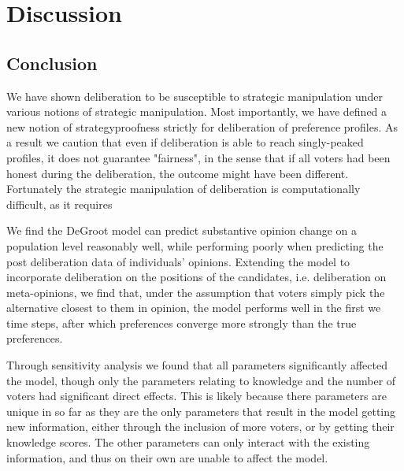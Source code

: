 \newpage
\chapter{Discussion}
\label{Discussion}


\section{Conclusion}

We have shown deliberation to be susceptible to strategic manipulation under
various notions of strategic manipulation. Most importantly, we have defined a
new notion of strategyproofness strictly for deliberation of preference
profiles. As a result we caution that even if deliberation is able to reach
singly-peaked profiles, it does not guarantee "fairness", in the sense that if
all voters had been honest during the deliberation, the outcome might have been
different. Fortunately the strategic manipulation of deliberation is computationally difficult,
as it requires

We find the DeGroot model can predict substantive opinion change on a
population level reasonably well, while performing poorly when predicting the
post deliberation data of individuals' opinions. Extending the model to
incorporate deliberation on the positions of the candidates, i.e. deliberation
on meta-opinions, we find that, under the assumption that voters simply pick
the alternative closest to them in opinion, the model performs well in the
first we time steps, after which preferences converge more strongly than the
true preferences.

Through sensitivity analysis we found that all parameters significantly
affected the model, though only the parameters relating to knowledge and the
number of voters had significant direct effects. This is likely because there
parameters are unique in so far as they are the only parameters that result in
the model getting new information, either through the inclusion of more voters,
or by getting their knowledge scores. The other parameters can only interact
with the existing information, and thus on their own are unable to affect the
model.








